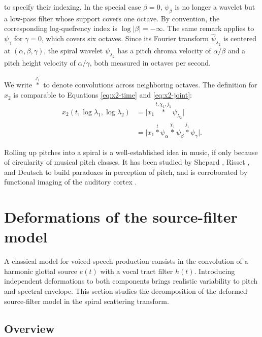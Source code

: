 \documentclass[twoside,a4paper]{article}
\begin{document}
to specify their indexing. In the special case $\beta = 0$, $\psi_\beta$ is no longer a wavelet but a low-pass filter whose support covers one octave. By convention, the corresponding log-quefrency index is $\log \vert \beta \vert = - \infty$. The same remark applies to $\psi_{\gamma}$ for $\gamma=0$, which covers six octaves. Since its Fourier transform $\widehat{\psi}_{\lambda_2}$  is centered at $(\alpha,\beta,\gamma)$, the spiral wavelet $\psi_{\lambda_2}$ has a pitch chroma velocity of $\alpha/\beta$ and a pitch height velocity of $\alpha/\gamma$, both measured in octaves per second.

We write $\overset{j_{1}}{\ast}$ to denote convolutions across neighboring octaves.
The definition for $x_2$ is comparable to Equations \ref{eq:x2-time} and \ref{eq:x2-joint}:
\begin{equation}
\begin{split}
x_{2}(t,\log \lambda_{1},\log \lambda_{2})
& = \vert x_{1} \overset{t,\chi_{1},j_{1}}{\ast} \psi_{\lambda_{2}}\vert \\
&= \vert x_{1} \overset{t}{\ast} \psi_\alpha \overset{\chi_{1}}{\ast} \psi_\beta \overset{j_{1}}{\ast} \psi_\gamma \vert
.
\end{split}
\label{eq:x2-spiral}
\end{equation}

Rolling up pitches into a spiral is a well-established idea in music, if only because of circularity of musical pitch classes. It has been studied by Shepard \cite{Shepard1964}, Risset \cite{Risset1969}, and Deutsch \cite{Deutsch2008} to build paradoxes in perception of pitch, and is corroborated by functional imaging of the auditory cortex \cite{Warren2003}.





\section{Deformations of the source-filter model}
A classical model for voiced speech production consists in the convolution of a harmonic glottal source $e(t)$ with a vocal tract filter $h(t)$.
Introducing independent deformations to both components brings realistic variability to pitch and spectral envelope.
This section studies the decomposition of the deformed source-filter model in the spiral scattering transform.

\subsection{Overview}
\end{document}
